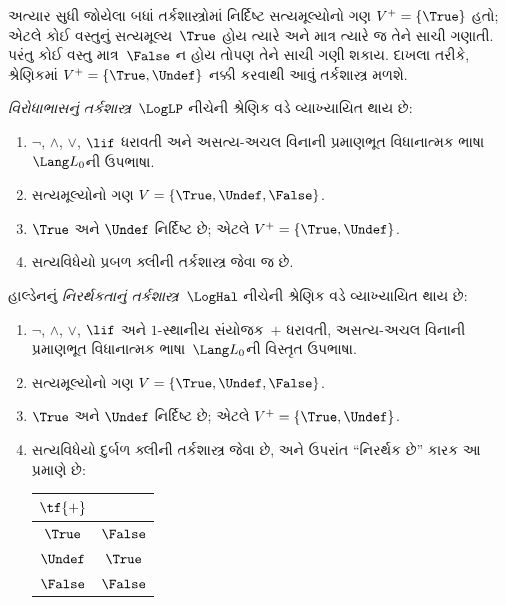 \begingroup
\makeatletter{}\makeatother


\label{guunit:OLP-0397}


અત્યાર સુધી જોયેલા બધાં તર્કશાસ્ત્રોમાં નિર્દિષ્ટ સત્યમૂલ્યોનો ગણ
$V^+ = \{\True\}$ હતો; એટલે કોઈ વસ્તુનું સત્યમૂલ્ય~$\True$
હોય ત્યારે અને માત્ર ત્યારે જ તેને સાચી ગણાતી. પરંતુ કોઈ વસ્તુ
માત્ર~$\False$ ન હોય તોપણ તેને સાચી ગણી શકાય. દાખલા તરીકે,
શ્રેણિકમાં $V^+ = \{\True, \Undef\}$ નક્કી કરવાથી આવું
તર્કશાસ્ત્ર મળશે.

\begin{defn}
\emph{વિરોધાભાસનું તર્કશાસ્ત્ર}~$\LogLP$ નીચેની શ્રેણિક વડે વ્યાખ્યાયિત થાય છે:
\begin{enumerate}
  \item $\lnot$, $\land$, $\lor$, $\lif$ ધરાવતી અને
  અસત્ય-અચલ વિનાની પ્રમાણભૂત વિધાનાત્મક ભાષા~$\Lang L_0$ની ઉપભાષા.
  \item સત્યમૂલ્યોનો ગણ $V = \{\True, \Undef, \False\}$.
  \item $\True$ અને $\Undef$ નિર્દિષ્ટ છે; એટલે $V^+ = \{\True, \Undef\}$.
  \item સત્યવિધેયો પ્રબળ ક્લીની તર્કશાસ્ત્ર જેવા જ છે.
\end{enumerate}
\end{defn}

\begin{defn}
હાલ્ડેનનું \emph{નિરર્થકતાનું તર્કશાસ્ત્ર}~$\LogHal$ નીચેની શ્રેણિક વડે
વ્યાખ્યાયિત થાય છે:
\begin{enumerate}
  \item $\lnot$, $\land$, $\lor$, $\lif$ અને $1$-સ્થાનીય
  સંયોજક~$+$ ધરાવતી, અસત્ય-અચલ વિનાની પ્રમાણભૂત
  વિધાનાત્મક ભાષા~$\Lang L_0$ની વિસ્તૃત ઉપભાષા.
  \item સત્યમૂલ્યોનો ગણ $V = \{\True, \Undef, \False\}$.
  \item $\True$ અને $\Undef$ નિર્દિષ્ટ છે; એટલે $V^+ = \{\True, \Undef\}$.
  \item સત્યવિધેયો દુર્બળ ક્લીની તર્કશાસ્ત્ર જેવા છે, અને ઉપરાંત
  ``નિરર્થક છે'' કારક આ પ્રમાણે છે:
  \begin{center}
    \begin{tabular}{c|c}
    $\tf{+}$ & \\
    \hline
    $\True$ & $\False$ \\
    $\Undef$ & $\True$ \\
    $\False$ & $\False$
    \end{tabular}
  \end{center}
\end{enumerate}
\end{defn}

